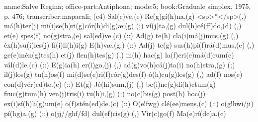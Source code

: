 name:Salve Regina;
office-part:Antiphona;
mode:5;
book:Graduale simplex, 1975, p. 476;
transcriber:mapacali;
(c4) Sal(c)ve,(e) Re(g)gí(h)na,(g) <sp>*</sp>(,) má(h)ter(j) mi(i)se(h)ri(g)cór(h)di(g)æ;(g) (;) ví(j)ta,(g) dul(h)cé(ff)do,(d) (,) et(e) spes(f) no(g)stra,(e) sal(ed)ve.(c) (::) Ad(g) te(h) cla(i)má(j)mus,(g) (,) éx(h)su(i)les(j) fí(i)li(h)i(g) E(h)væ.(g.) (::) Ad(j) te(g) sus(h)pi(f)rá(d)mus,(e) (,) ge(e)mén(g)tes(h) et(j) flen(h)tes(g) (,) in(h) hac(g) la(f)cri(e)má(d)rum(e) vál(d)le.(c) (::) E(g)ia(h) er(i)go,(j) (,) ad(g)vo(h)cá(j)ta(i) no(h)stra,(g) (;) il(j)los(g) tu(h)os(f) mi(d)se(e)ri(f)cór(g)des(f) ó(h)cu(g)los(g) (,) ad(f) nos(e) con(d)vér(ed)te.(c) (::) Et(g) Jé(hi)sum,(j) (,) be(i)ne(g)dí(h)ctum(g) fruc(g)tum(h) ven(j)tris(i) tu(h)i,(g) (;) no(c)bis(g) post(h) hoc(j) ex(i)sí(h)li(g)um(e) o(f)stén(ed)de.(c) (::) O(e!fwg) clé(ee)mens,(c) (::) o(g!hwi/ji) pí(hg)a,(g) (::) o(jj//ghf/fd) dul(ef)cis(g) (,) Vir(c)go(f) Ma(e)rí(dc)a.(c) 